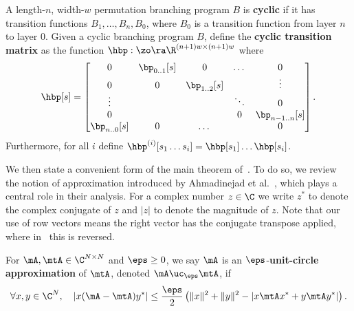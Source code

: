 \documentclass{toc}
\begin{document}
\begin{definition}
    A length-$n$, width-$w$ permutation branching program $B$ is \textbf{cyclic} if it has transition functions $B_1,\ldots,B_n,B_0$, where $B_0$ is a transition function from layer $n$ to layer $0$. Given a cyclic branching program $B$, define the \textbf{cyclic transition matrix} as the function $\hbp:\zo\ra \R^{(n+1)w\times(n+1)w}$ where
    \[\hbp[s] = \begin{bmatrix}
    0 & \bp_{0..1}[s] & 0 & \dots & 0\\
    0 & 0 & \bp_{1..2}[s] &  & \vdots\\
    \vdots & &  & \ddots & 0\\
    0 & ~ &   & 0 & \bp_{n-1..n}[s]\\
    \bp_{n..0}[s] & 0 & \dots & & 0\\
    \end{bmatrix}.\]
    Furthermore, for all $i$ define $\hbp^{(i)}[s_1\dots s_i]=\hbp[s_1]\dots\hbp[s_i]$.
\end{definition}
    
We then state a convenient form of the main theorem of~\cite{HozaPyVa21}. To do so, we review the notion of approximation introduced by Ahmadinejad et al.~\cite{AhmadinejadKeMuPeSiVa19}, which plays a central role in their analysis.
For a complex number $z \in \C$ we write $z^*$ to denote the complex conjugate of $z$ and $|z|$ to denote the magnitude of $z$. Note that our use of row vectors means the right vector has the conjugate transpose applied, where in~\cite{AhmadinejadKeMuPeSiVa19} this is reversed.

\begin{definition}
    For $\mA,\mtA \in \C^{N\times N}$ and $\eps\geq 0$, we say $\mA$ is an $\eps$-\textbf{unit-circle approximation} of $\mtA$, denoted $\mA\uc_\eps \mtA$, if
    \[ \forall x,y \in \C^N, \quad \left|x(\mA-\mtA)y^*\right| \leq \frac{\eps}{2}\left(\|x\|^2+\|y\|^2-\left|x\mtA x^*+y\mtA y^*\right|\right).\]
\end{definition}
    
\end{document}
